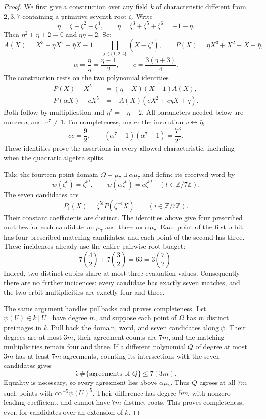 \begin{proof}
We first give a construction over any field $k$ of characteristic different
from $2,3,7$ containing a primitive seventh root $\zeta$.
Write
\[
 \eta=\zeta+\zeta^2+\zeta^4,\qquad
 \bar\eta=\zeta^3+\zeta^5+\zeta^6=-1-\eta.
\]
Then $\eta^2+\eta+2=0$ and $\eta\bar\eta=2$.  Set
\[
 A(X)=X^3-\eta X^2+\bar\eta X-1
     =\prod_{j\in\{1,2,4\}}(X-\zeta^j),\qquad
 P(X)=\eta X^3+X^2+X+\bar\eta,
\]
\[
 \alpha=\frac{\bar\eta}{\eta}=\frac{\eta-1}{2},
 \qquad c=\frac{3(\eta+3)}4.
\]
The construction rests on the two polynomial identities
\begin{align}
 P(X)-X^5&=(\bar\eta-X)(X-1)A(X),\label{eq:paley-seven-first}\\
 P(\alpha X)-cX^5&=-A(X)(cX^2+c\eta X+\bar\eta).
 \label{eq:paley-seven-second}
\end{align}
Both follow by multiplication and $\eta^2=-\eta-2$.
All parameters needed below are nonzero, and $\alpha^7\ne1$.
For completeness, under the involution $\eta\leftrightarrow\bar\eta$,
\[
 c\bar c=\frac92,\qquad
 (\alpha^7-1)(\bar\alpha^7-1)=\frac{7^3}{2^7}.
\]
These identities prove the assertions in every allowed characteristic,
including when the quadratic algebra splits.

Take the fourteen-point domain
$\Omega=\mu_7\sqcup\alpha\mu_7$ and define its received word by
\[
 w(\zeta^t)=\zeta^{5t},\qquad
 w(\alpha\zeta^t)=c\zeta^{5t}\quad(t\in\mathbb Z/7\mathbb Z).
\]
The seven candidates are
\[
 P_i(X)=\zeta^{5i}P(\zeta^{-i}X)
 \qquad(i\in\mathbb Z/7\mathbb Z).
\]
Their constant coefficients are distinct.  The identities above give four
prescribed matches for each candidate on $\mu_7$ and three on
$\alpha\mu_7$.  Each point of the first orbit has four prescribed matching
candidates, and each point of the second has three.  These incidences
already use the entire pairwise root budget:
\[
 7\binom42+7\binom32=63=3\binom72.
\]
Indeed, two distinct cubics share at most three evaluation values.
Consequently there are no further incidences: every candidate has exactly
seven matches, and the two orbit multiplicities are exactly four and three.

The same argument handles pullbacks and proves completeness.
Let $\psi(U)\in k[U]$ have degree $m$, and suppose each point of $\Omega$
has $m$ distinct preimages in $k$.  Pull back the domain, word, and seven
candidates along $\psi$.  Their degrees are at most $3m$, their agreement
counts are $7m$, and the matching multiplicities remain four and three.
If a different polynomial $Q$ of degree at most $3m$ has at least $7m$
agreements, counting its intersections with the seven candidates gives
\[
 3\,\#\{\text{agreements of }Q\}\leq7(3m).
\]
Equality is necessary, so every agreement lies above $\alpha\mu_7$.
Thus $Q$ agrees at all $7m$ such points with
$c\alpha^{-5}\psi(U)^5$.  Their difference has degree $5m$, with nonzero
leading coefficient, and cannot have $7m$ distinct roots.  This proves
completeness, even for candidates over an extension of $k$.


\end{proof}
